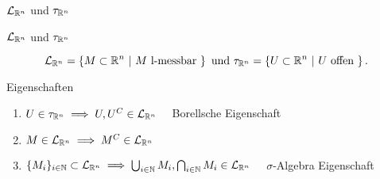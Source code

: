 \documentclass[class=article, crop=false]{standalone}
\begin{document}
\begin{zettel}{$\mathcal{L}_{\mathbb{R}^n}$ und $\tau_{\mathbb{R}^n}$}

\begin{flashcard}[eh1bs6w7]{$\mathcal{L}_{\mathbb{R}^n}$ und $\tau_{\mathbb{R}^n}$}
	\begin{definition}
		\[
			\mathcal{L}_{\R^n} = \set{M \subset \R^n}{M \tx{l-messbar}} \tx{und} \tau_{ \R^n} = \set{U \subset \R^n}{U \tx{offen} }
		.\]
	\end{definition}
\end{flashcard}

\begin{lemma}
	Eigenschaften
	\begin{enumerate}
		\item $U \in \tau_{ \mathbb{R}^n } \implies U, U^C \in  \mathcal{L}_{ \mathbb{R}^n }$ \ \ Borellsche Eigenschaft
		\item $M \in  \mathcal{L}_{ \mathbb{R}^n } \implies M^C  \in  \mathcal{L}_{ \mathbb{R}^n }$
		\item $\set{M_i}_{i \in  \N } \subset  \La_{ \R^n } \implies \bigcup_{i \in  \N  } M_i, \bigcap_{i \in  \N  } M_i \in  \La_{ \R^n }$ \ \ $\sigma$-Algebra Eigenschaft
	\end{enumerate}
\end{lemma}
\end{zettel}
\end{document}

